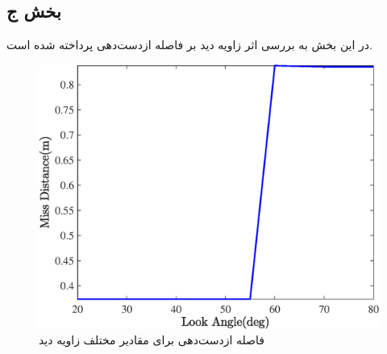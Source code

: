 \subsection{بخش ج}
در این بخش به بررسی اثر زاویه دید بر فاصله‌ ازدست‌دهی پرداخته شده است.
\begin{figure}[H]
	\centering
	\includegraphics[width=.75\linewidth]{../Figure/Q1/f/MD}
	\caption{فاصله ازدست‌دهی برای مقادیر مختلف زاویه دید}
\end{figure}